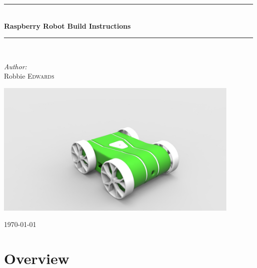 \documentclass[12pt,titlepage,oneside]{memoir}
\newcommand{\HRule}{\rule{\linewidth}{0.5mm}}
\begin{document}
\begin{titlingpage}
\begin{center}


\vspace{50mm}
\HRule \\[0.4cm]
{ \huge \bfseries Raspberry Robot Build Instructions}\\[0.4cm]

\HRule \\[1.5cm]

\begin{minipage}{0.4\textwidth}
\begin{flushleft} \large
\emph{Author:}\\
Robbie \textsc{Edwards}\\
\end{flushleft}
\end{minipage}
\vfill
\includegraphics[width=450px]{render/pibot2.jpg}
\vspace*{1cm}

{\large \today}

\end{center}
\end{titlingpage}



\mainmatter
{}

\chapter{Overview}
\end{document}
